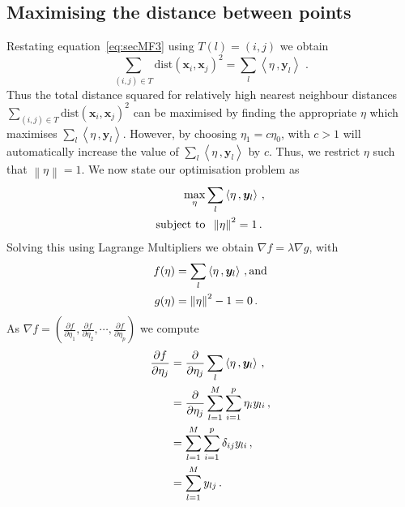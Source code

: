 \documentclass[11pt]{article}
\newcommand{\dist}{\text{dist}}
\begin{document}
\subsection{Maximising the distance between points}\label{sec:MathFrame2}
Restating equation~\eqref{eq:secMF3} using $T(l) = (i,j)$ we obtain
\begin{equation} \label{eq:secMF4}
    \sum_{(i,j) \in T}\dist(\bm{x}_i, \bm{x}_j)^2 = \sum_{l}\left\langle \eta\, ,  \bm{y}_{l} \right\rangle\, \, .
\end{equation}
Thus  the total distance squared for relatively high nearest neighbour distances $ \sum_{(i,j) \in T}\dist(\bm{x}_i, \bm{x}_j)^2$  can be maximised by finding the appropriate $\eta$ which maximises $\sum_{l}\left\langle \eta\, ,  \bm{y}_{l} \right\rangle$. However, by choosing $\eta_1 = c \eta_0 $, with $c >1$ will automatically increase the value of $\sum_{l}\left\langle \eta\, ,  \bm{y}_{l} \right\rangle$ by $c$. Thus, we restrict $\eta$ such that $\left \lVert \eta \right\rVert = 1$.  We now state our optimisation problem as
\begin{align} \label{eq:secMF5}
     \max_\eta & \sum_{l}\left\langle \eta\, ,  \bm{y}_{l} \right\rangle \, , \\ 
   \text{subject to} & \hspace{0.2cm}   \left \lVert \eta \right\rVert^2  = 1 \notag \, .
\end{align}
Solving this using Lagrange Multipliers we obtain $\nabla f  = \lambda \nabla g$, with 
\begin{align}\label{eq:secMF6}
    f(\eta) & = \sum_{l}\left\langle \eta\, ,  \bm{y}_{l} \right\rangle  \, , \text{and} \\
    g(\eta)  & = \left \lVert \eta \right\rVert^2  - 1 = 0 \, . \notag
\end{align}
As $\nabla f = \left( \frac{\partial f}{\partial \eta_1},  \frac{\partial f}{\partial \eta_2},  \cdots, \frac{\partial f}{\partial \eta_p} \right)$ we compute
\begin{align}\label{eq:secMF7}
\frac{\partial f}{\partial \eta_j} & =  \frac{\partial }{\partial \eta_j}\sum_{l}\left\langle \eta\, ,  \bm{y}_{l} \right\rangle \, ,  \notag  \\
& = \frac{\partial }{\partial \eta_j} \sum_{l=1}^M \sum_{i=1}^p \eta_i y_{li} \, ,\notag \\
& = \sum_{l=1}^M \sum_{i=1}^p  \delta_{ij} y_{li} \, , \notag \\
& = \sum_{l=1}^M y_{lj} \, . 
\end{align}
\end{document}
